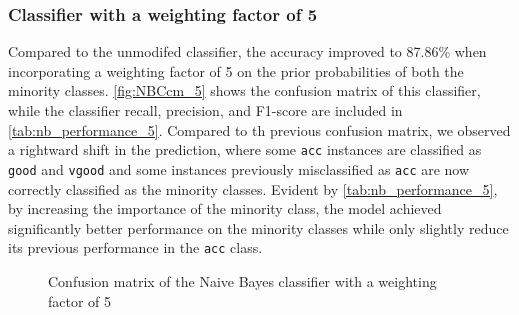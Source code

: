 \documentclass[a4paper]{article}
\begin{document}
\subsubsection{Classifier with a weighting factor of 5}
Compared to the unmodifed classifier, the accuracy improved to 87.86\% when incorporating a weighting factor of 5 on the prior probabilities of both the minority classes. \autoref{fig:NBCcm_5} shows the confusion matrix of this classifier, while the classifier recall, precision, and F1-score are included in \autoref{tab:nb_performance_5}. Compared to th previous confusion matrix, we observed a rightward shift in the prediction, where some \lstinline{acc} instances are classified as \lstinline{good} and \lstinline{vgood} and some instances previously misclassified as \lstinline{acc} are now correctly classified as the minority classes. Evident by \autoref{tab:nb_performance_5}, by increasing the importance of the minority class, the model achieved significantly better performance on the minority classes while only slightly reduce its previous performance in the \lstinline{acc} class.

\begin{figure} [h]
  \caption{Confusion matrix of the Naive Bayes classifier with a weighting factor of 5} 
  \label{fig:NBCcm_5}
\end{figure}
\end{document}
